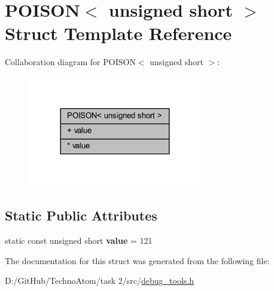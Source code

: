 \hypertarget{struct_p_o_i_s_o_n_3_01unsigned_01short_01_4}{}\section{P\+O\+I\+S\+ON$<$ unsigned short $>$ Struct Template Reference}
\label{struct_p_o_i_s_o_n_3_01unsigned_01short_01_4}


Collaboration diagram for P\+O\+I\+S\+ON$<$ unsigned short $>$\+:
\nopagebreak
\begin{figure}[H]
\begin{center}
\leavevmode
\includegraphics[width=216pt]{struct_p_o_i_s_o_n_3_01unsigned_01short_01_4__coll__graph}
\end{center}
\end{figure}
\subsection*{Static Public Attributes}
\textbf{ }\par
\begin{DoxyCompactItemize}
\item 
\mbox{\label{struct_p_o_i_s_o_n_3_01unsigned_01short_01_4_a0a82e6d7b747a1a3eeeafa834ae87029}} 
static const unsigned short {\bfseries value} = 121
\end{DoxyCompactItemize}



The documentation for this struct was generated from the following file\+:\begin{DoxyCompactItemize}
\item 
D\+:/\+Git\+Hub/\+Techno\+Atom/task 2/src/\hyperlink{debug__tools_8h}{debug\+\_\+tools.\+h}\end{DoxyCompactItemize}
